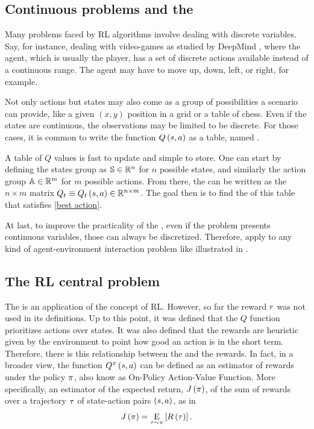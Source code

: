 \documentclass[conference]{IEEEtran}
\begin{document}
\subsection{Continuous problems and the {\Qtable}}\label{continuous problems}

Many problems faced by RL algorithms involve dealing with discrete variables.
Say, for instance, dealing with video-games as studied by DeepMind \cite{DeepMind:AtariDeepRL}, where the agent, which is usually the player, has a set of discrete actions available instead of a continuous range.
The agent may have to move up, down, left, or right, for example.

Not only actions but states may also come as a group of possibilities a scenario can provide, like a given $(x,y)$ position in a grid or a table of chess.
Even if the states are continuous, the observations may be limited to be discrete.
For those cases, it is common to write the function $\Qf$ as a table, named {\Qtable}.

A table of $Q$ values is fast to update and simple to store.
One can start by defining the states group as $\mathbb{S} \in \mathbb{R}^n$ for $n$ possible states, and similarly the action group $\mathbb{A} \in \mathbb{R}^m$ for $m$ possible actions.
From there, the {\Qtable} can be written as the $n \times m$ matrix $\Qtarget \equiv \Qftarget \in \Real^{n \times m}$.
The goal then is to find the {\Qvalues} of this table that satisfies \eqref{best action}.

At last, to improve the practicality of the {\Qtable}, even if the problem presents continuous variables, those can always be discretized.
Therefore, {\Qtables} apply to any kind of agent-environment interaction problem like illustrated in .


\subsection{The RL central problem}\label{RL central problem}

The {\Qlearning} is an application of the concept of RL.
However, so far the reward $r$ was not used in its definitions.
Up to this point, it was defined that the $Q$ function prioritizes actions over states.
It was also defined that the rewards are heuristic given by the environment to point how good an action is in the short term.
Therefore, there is this relationship between the {\Qvalues} and the rewards.
In fact, in a broader view, the function $\Qf[^{\policy}]$ can be defined as an estimator of rewards under the policy $\pi$, also know as On-Policy Action-Value Function.
More specifically, an estimator of the expected return, $\expectedreturn$, of the sum of rewards over a trajectory $\tau$ of state-action pairs $\stateaction$, as in
\begin{equation}
    \expectedreturn = \Expected[\trajectory \sim \policy]{\rewardftraj}.
    \label{expected return}
\end{equation}
\end{document}
